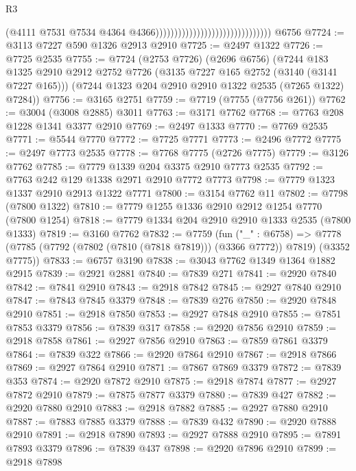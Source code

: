 \begin{lexlean}{R3}
\begin{coremodule}
                                                                (@4111
                                                                  @7531
                                                                  @7534
                                                                  @4364
                                                                  @4366)))))))))))))))))))))))))))))))
    @6756
@7724 := @3113 @7227 @590 @1326 @2913 @2910
@7725 := @2497 @1322
@7726 := @7725 @2535
@7755 := @7724
    (@2753 @7726)
    (@2696 @6756)
    (@7244
      @183
      @1325
      @2910
      @2912
      @2752
      @7726
      (@3135 @7227 @165 @2752 (@3140 (@3141 @7227 @165)))
      (@7244 @1323 @204 @2910 @2910 @1322 @2535 (@7265 @1322) @7284))
@7756 := @3165 @2751
@7759 := @7719 (@7755 (@7756 @261))
@7762 := @3004 (@3008 @2885) @3011
@7763 := @3171 @7762
@7768 := @7763 @208 @1228 @1341 @3377 @2910
@7769 := @2497 @1333
@7770 := @7769 @2535
@7771 := @5544 @7770
@7772 := @7725 @7771
@7773 := @2496 @7772
@7775 := @2497 @7773 @2535
@7778 := @7768 @7775 (@2726 @7775)
@7779 := @3126 @7762
@7785 := @7779 @1339 @204 @3375 @2910 @7773 @2535
@7792 := @7763 @242 @129 @1338 @2971 @2910 @7772 @7773
@7798 := @7779 @1323 @1337 @2910 @2913 @1322 @7771
@7800 := @3154 @7762 @11
@7802 := @7798 (@7800 @1322)
@7810 := @7779 @1255 @1336 @2910 @2912 @1254 @7770 (@7800 @1254)
@7818 := @7779 @1334 @204 @2910 @2910 @1333 @2535 (@7800 @1333)
@7819 := @3160 @7762
@7832 := @7759
    (fun ("_" : @6758) =>
    @7778 (@7785 (@7792 (@7802 (@7810 (@7818 @7819))) (@3366 @7772)) @7819) (@3352 @7775))
@7833 := @6757 @3190
@7838 := @3043 @7762 @1349 @1364 @1882 @2915
@7839 := @2921 @2881
@7840 := @7839 @271
@7841 := @2920 @7840
@7842 := @7841 @2910
@7843 := @2918 @7842
@7845 := @2927 @7840 @2910
@7847 := @7843 @7845 @3379
@7848 := @7839 @276
@7850 := @2920 @7848 @2910
@7851 := @2918 @7850
@7853 := @2927 @7848 @2910
@7855 := @7851 @7853 @3379
@7856 := @7839 @317
@7858 := @2920 @7856 @2910
@7859 := @2918 @7858
@7861 := @2927 @7856 @2910
@7863 := @7859 @7861 @3379
@7864 := @7839 @322
@7866 := @2920 @7864 @2910
@7867 := @2918 @7866
@7869 := @2927 @7864 @2910
@7871 := @7867 @7869 @3379
@7872 := @7839 @353
@7874 := @2920 @7872 @2910
@7875 := @2918 @7874
@7877 := @2927 @7872 @2910
@7879 := @7875 @7877 @3379
@7880 := @7839 @427
@7882 := @2920 @7880 @2910
@7883 := @2918 @7882
@7885 := @2927 @7880 @2910
@7887 := @7883 @7885 @3379
@7888 := @7839 @432
@7890 := @2920 @7888 @2910
@7891 := @2918 @7890
@7893 := @2927 @7888 @2910
@7895 := @7891 @7893 @3379
@7896 := @7839 @437
@7898 := @2920 @7896 @2910
@7899 := @2918 @7898

\end{coremodule}
\end{lexlean}
